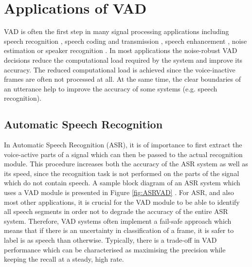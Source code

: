 
\section{Applications of VAD}

VAD is often the first step in many signal processing applications including speech recognition \cite{RamirezGorriz, Kuroiwa, Martin, Shafran, RamirezGorrizArt}, speech coding and transmission \cite{Sohn, RamirezGorriz, Prasad, G729, GSMControl}, speech enhancement \cite{Park, RamirezGorriz, Borisagar}, noise estimation \cite{RamirezGorriz} or speaker recognition \cite{Sahidullah}. In most applications the noise-robust VAD decisions reduce the computational load required by the system and improve its accuracy. The reduced computational load is achieved since the voice-inactive frames are often not processed at all. At the same time, the clear boundaries of an utterance help to improve the accuracy of some systems (e.g. speech recognition).

\subsection{Automatic Speech Recognition}

In Automatic Speech Recognition (ASR), it is of importance to first extract the voice-active parts of a signal which can then be passed to the actual recognition module. This procedure increases both the accuracy of the ASR system as well as its speed, since the recognition task is not performed on the parts of the signal which do not contain speech. A sample block diagram of an ASR system which uses a VAD module is presented in Figure \ref{fig:ASRVAD} \cite{RamirezGorriz}. For ASR, and also most other applications, it is crucial for the VAD module to be able to identify all speech segments in order not to degrade the accuracy of the entire ASR system. Therefore, VAD systems often implement a fail-safe approach which means that if there is an uncertainty in classification of a frame, it is safer to label is as speech than otherwise. Typically, there is a trade-off in VAD performance which can be characterised as maximising the precision while keeping the recall at a steady, high rate.

